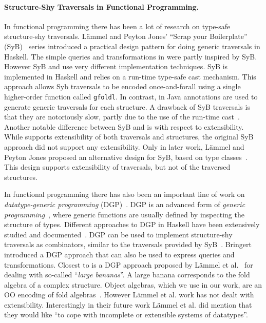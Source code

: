 
\paragraph{Structure-Shy Traversals in Functional Programming.}

In
functional programming there has been a lot of research on type-safe
structure-shy traversals. L\"ammel and Peyton Jones' ``Scrap your
Boilerplate'' (SyB)~\cite{ralf03syb,lammel04syb,lammel05syb} series
introduced a practical design pattern for doing generic
traversals in Haskell. The simple queries and transformations in
\name were partly inspired by SyB. However SyB and \name use very
different implementation techniques. SyB is implemented in Haskell and
relies on a run-time type-safe cast mechanism. This approach allows
Syb traversals to be encoded once-and-forall using a single
higher-order function called \lstinline{gfoldl}. In contrast, in \name
Java annotations are used to generate generic traversals for each
structure. A drawback of SyB traversals is that they are notoriously
slow, partly due to the use of the run-time
cast~\cite{adams2012tyb}. Another notable difference between SyB and
\name is with respect to extensibility. While \name supports
extensibility of both traversals and structures, the original SyB
approach did not support any extensibility. Only in later work,
L\"ammel and Peyton Jones proposed an alternative design for SyB,
based on type classes~\cite{wadler89type-classes}.
This design supports extensibility of traversals, but not of the
traversed structures.

In functional programming there has also been an important line of
work on \emph{datatype-generic programming} (DGP)~\cite{Gibbons07dgp}.  DGP is an
advanced form of \emph{generic programming}~\cite{GP}, where generic
functions are usually defined by inspecting the structure of
types.  Different approaches to DGP in Haskell have been extensively studied and documented~\cite{ComparingGPHaskellRodriquez,ComparingGPHaskellHinze}.
DGP can be used to implement structure-shy traversals as combinators,
similar to the traversals provided by SyB~\cite{hinze2003fun}.
Bringert~\cite{bjorn08acf}
introduced a DGP approach that can also be used to express queries
and transformations. Closest to \name is a DGP approach proposed by
L\"ammel et al.~\cite{lammel00dealing} for dealing with so-called
``\emph{large bananas}''. A large banana corresponds to the fold
algebra of a complex structure. Object algebras, which we use in our
work, are an OO encoding of fold algebras~\cite{Oliveira08visitor,bruno12oa}.
However L\"ammel et al. work has not dealt with extensibility. Interestingly
in their future work  L\"ammel et al. did mention that they would like ``to cope
with incomplete or extensible systems of datatypes''.

